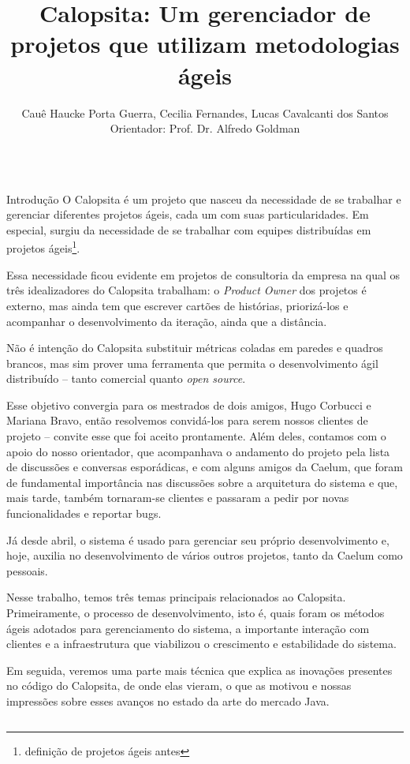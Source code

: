 \documentclass[serif,mathserif,final]{beamer}
\title{Calopsita: Um gerenciador de projetos que utilizam metodologias ágeis}
\author{Cauê Haucke Porta Guerra, Cecilia Fernandes, Lucas Cavalcanti dos Santos\\ Orientador: Prof. Dr. Alfredo Goldman}
\institute{Instituto de Matemática e Estatística\\
Universidade de São Paulo}
\newcommand{\calopsita}{Calopsita}
\newcommand{\opensource}{\textit{open source}}
\begin{document}
\begin{frame}{}
  \begin{columns}[t]

    \begin{column}{0.32\linewidth}

      \begin{block}{Introdução}
        O \calopsita{} é um projeto que nasceu da necessidade de se trabalhar e gerenciar diferentes projetos ágeis, cada um com suas particularidades. Em especial, surgiu da necessidade de se trabalhar com equipes distribuídas em projetos ágeis\footnote{definição de projetos ágeis antes}. 

				Essa necessidade ficou evidente em projetos de consultoria da empresa na qual os três idealizadores do \calopsita{} trabalham: o \textit{Product Owner}
				dos projetos é externo, mas ainda tem que escrever cartões de histórias, priorizá-los e acompanhar o desenvolvimento da iteração, ainda que a distância.

				Não é intenção do \calopsita{} substituir métricas coladas em paredes e quadros brancos, mas sim prover uma ferramenta que permita o desenvolvimento ágil distribuído -- tanto comercial quanto \opensource{}.  

				Esse objetivo convergia para os mestrados de dois amigos, Hugo Corbucci e Mariana Bravo, então resolvemos convidá-los para serem nossos clientes de projeto -- convite esse que foi aceito prontamente. Além deles, contamos com o apoio do nosso orientador, que acompanhava o andamento do projeto pela lista de discussões e conversas esporádicas, e com alguns amigos da Caelum, que foram de fundamental importância nas discussões sobre a arquitetura do sistema e que, mais tarde, também tornaram-se clientes e passaram a pedir por novas funcionalidades e reportar bugs. 

				Já desde abril, o sistema é usado para gerenciar seu próprio desenvolvimento e, hoje, auxilia no desenvolvimento de vários outros projetos, tanto da Caelum como pessoais.

				Nesse trabalho, temos três temas principais relacionados ao \calopsita{}. Primeiramente, o processo de desenvolvimento, isto é, quais foram os métodos ágeis adotados para gerenciamento do sistema, a importante interação com clientes e a infraestrutura que viabilizou o crescimento e estabilidade do sistema. 

				Em seguida, veremos uma parte mais técnica que explica as inovações presentes no código do \calopsita{}, de onde elas vieram, o que as motivou e nossas impressões sobre esses avanços no estado da arte do mercado Java.


\end{block}
\end{column}
\end{columns}
\end{frame}
\end{document}
